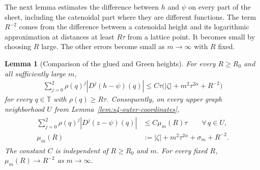 \documentclass[a4paper,11pt,oneside,reqno]{amsart}
\numberwithin{equation}{section}
\newtheorem{lemma}[theorem]{Lemma}
\theoremstyle{definition}
\begin{document}
The next lemma estimates the difference between $h$ and
$\psi$ on every part of the sheet, including the catenoidal
part where they are different functions. The term $R^{-2}$
comes from the difference between a catenoidal height and
its logarithmic approximation at distances at least
$R\tau$ from a lattice point. It becomes small by choosing
$R$ large. The other errors become small as $m\to\infty$
with $R$ fixed.

\begin{lemma}[Comparison of the glued and Green heights]
    \label{lem:s4-glued-Green-comparison}
    For every $R\geq R_0$ and all sufficiently large $m$,
    \begin{align}
        \label{eq:s4-glued-Green-comparison}
        \sum_{j=0}^2\rho(q)^j|D^j(h-\psi)(q)|
        \leq C\tau\bigl(|\zeta|+m^2\tau^{2\alpha}+R^{-2}\bigr)
    \end{align}
    for every $q\in\mathbb T$ with $\rho(q)\geq R\tau$.
    Consequently, on every upper graph neighborhood $U$
    from Lemma~\ref{lem:s4-outer-coordinates},
    \begin{align}
        \label{eq:s4-final-Green-comparison}
        \begin{split}
            \sum_{j=0}^2\rho(q)^j|D^j(z-\psi)(q)|
            &\leq C\mu_m(R)\tau
                     \qquad\forall\,q\in U,\\
            \mu_m(R)&:=|\zeta|+m^2\tau^{2\alpha}
                            +\sigma_m+R^{-2}.
        \end{split}
    \end{align}
    The constant $C$ is independent of $R\geq R_0$ and $m$.
    For every fixed $R$, $\mu_m(R)\to R^{-2}$ as
    $m\to\infty$.
\end{lemma}
\end{document}
